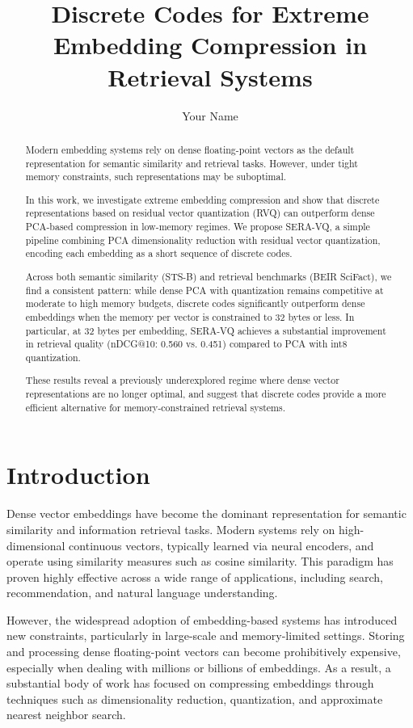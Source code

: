 \documentclass{article}
\title{Discrete Codes for Extreme Embedding Compression in Retrieval Systems}
\author{Your Name}
\begin{document}
\maketitle

\begin{abstract}
Modern embedding systems rely on dense floating-point vectors as the default representation for semantic similarity and retrieval tasks. However, under tight memory constraints, such representations may be suboptimal.

In this work, we investigate extreme embedding compression and show that discrete representations based on residual vector quantization (RVQ) can outperform dense PCA-based compression in low-memory regimes. We propose SERA-VQ, a simple pipeline combining PCA dimensionality reduction with residual vector quantization, encoding each embedding as a short sequence of discrete codes.

Across both semantic similarity (STS-B) and retrieval benchmarks (BEIR SciFact), we find a consistent pattern: while dense PCA with quantization remains competitive at moderate to high memory budgets, discrete codes significantly outperform dense embeddings when the memory per vector is constrained to 32 bytes or less. In particular, at 32 bytes per embedding, SERA-VQ achieves a substantial improvement in retrieval quality (nDCG@10: 0.560 vs. 0.451) compared to PCA with int8 quantization.

These results reveal a previously underexplored regime where dense vector representations are no longer optimal, and suggest that discrete codes provide a more efficient alternative for memory-constrained retrieval systems.
\end{abstract}

\section{Introduction}

Dense vector embeddings have become the dominant representation for semantic similarity and information retrieval tasks. Modern systems rely on high-dimensional continuous vectors, typically learned via neural encoders, and operate using similarity measures such as cosine similarity. This paradigm has proven highly effective across a wide range of applications, including search, recommendation, and natural language understanding.

However, the widespread adoption of embedding-based systems has introduced new constraints, particularly in large-scale and memory-limited settings. Storing and processing dense floating-point vectors can become prohibitively expensive, especially when dealing with millions or billions of embeddings. As a result, a substantial body of work has focused on compressing embeddings through techniques such as dimensionality reduction, quantization, and approximate nearest neighbor search.
\end{document}
